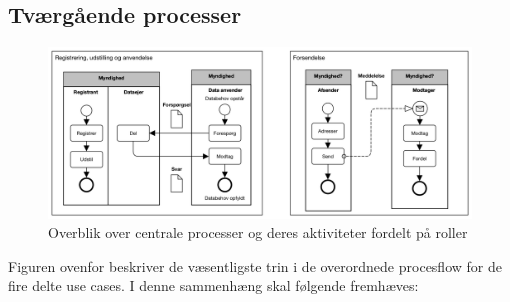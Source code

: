 \subsection{Tværgående processer}\label{tvuxe6rguxe5ende-processer}

\begin{figure}
\centering
\includegraphics{figures/patterns.png}
\caption{Overblik over centrale processer og deres aktiviteter fordelt
på roller}
\end{figure}

Figuren ovenfor beskriver de væsentligste trin i de overordnede
procesflow for de fire delte use cases. I denne sammenhæng skal følgende
fremhæves:

